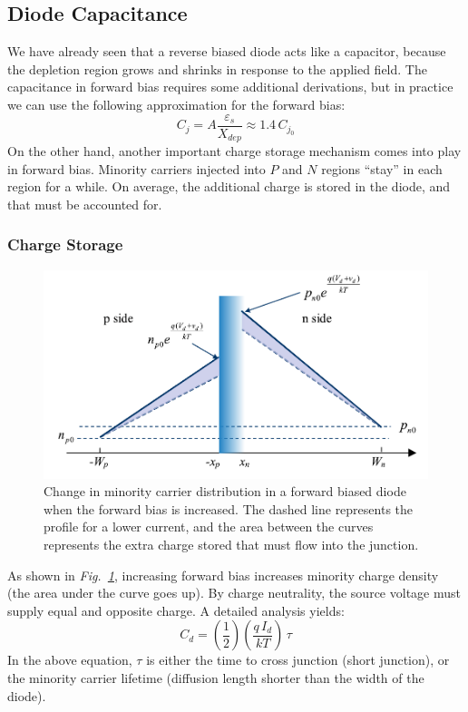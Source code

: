 \subsection{Diode Capacitance}
We have already seen that a reverse biased diode acts like a capacitor, because the depletion region grows and shrinks in response to the applied field.  The capacitance in forward bias requires some additional derivations, but in practice we can use the following approximation for the forward bias:
    \begin{equation}
        C_j = A\frac{\varepsilon_s}{X_{dep}} \approx 1.4\,C_{j_0}
    \end{equation}
On the other hand, another important charge storage mechanism comes into play in forward bias.  Minority carriers injected into $P$ and $N$ regions “stay” in each region for a while.  On average, the additional charge is stored in the diode, and that must be accounted for.
\subsubsection*{Charge Storage} \label{sec:charge_storage}
\begin{figure}[tb]
\centering
\includegraphics[width=.85\columnwidth]{slide47}
\caption{Change in minority carrier distribution in a forward biased diode when the forward bias is increased.  The dashed line represents the profile for a lower current, and the area between the curves represents the extra charge stored that must flow into the junction.}
\label{fig:slide47}
\end{figure}
As shown in \emph{Fig.~\ref{fig:slide47}}, increasing forward bias increases minority charge density (the area under the curve goes up).   By charge neutrality, the source voltage must supply equal and opposite charge.  A detailed analysis yields:
    \begin{equation}
        C_d = \left( \frac{1}{2} \right) \left( \frac{q\,I_d}{kT} \right)\,\tau
    \end{equation}
In the above equation, $\tau$ is either the time to cross junction (short junction), or the minority carrier lifetime (diffusion length shorter than the width of the diode).

